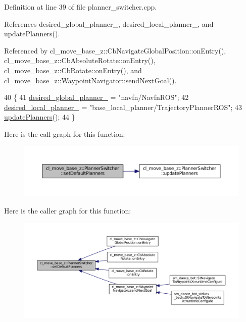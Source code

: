 Definition at line 39 of file planner\+\_\+switcher.\+cpp.



References desired\+\_\+global\+\_\+planner\+\_\+, desired\+\_\+local\+\_\+planner\+\_\+, and update\+Planners().



Referenced by cl\+\_\+move\+\_\+base\+\_\+z\+::\+Cb\+Navigate\+Global\+Position\+::on\+Entry(), cl\+\_\+move\+\_\+base\+\_\+z\+::\+Cb\+Absolute\+Rotate\+::on\+Entry(), cl\+\_\+move\+\_\+base\+\_\+z\+::\+Cb\+Rotate\+::on\+Entry(), and cl\+\_\+move\+\_\+base\+\_\+z\+::\+Waypoint\+Navigator\+::send\+Next\+Goal().


\begin{DoxyCode}
40 \{
41   \hyperlink{classcl__move__base__z_1_1PlannerSwitcher_aef047d3778b2993c1df146bbad43e03d}{desired\_global\_planner\_} = \textcolor{stringliteral}{"navfn/NavfnROS"};
42   \hyperlink{classcl__move__base__z_1_1PlannerSwitcher_a6cbf65f11bb69125f913caaabdf7b4cf}{desired\_local\_planner\_} = \textcolor{stringliteral}{"base\_local\_planner/TrajectoryPlannerROS"};
43   \hyperlink{classcl__move__base__z_1_1PlannerSwitcher_a146641f63aea3185daab4c5cbb789550}{updatePlanners}();
44 \}
\end{DoxyCode}


Here is the call graph for this function\+:
\nopagebreak
\begin{figure}[H]
\begin{center}
\leavevmode
\includegraphics[width=350pt]{classcl__move__base__z_1_1PlannerSwitcher_ad3f0d08a51af6218d203bf44a7f9df40_cgraph}
\end{center}
\end{figure}




Here is the caller graph for this function\+:
\nopagebreak
\begin{figure}[H]
\begin{center}
\leavevmode
\includegraphics[width=350pt]{classcl__move__base__z_1_1PlannerSwitcher_ad3f0d08a51af6218d203bf44a7f9df40_icgraph}
\end{center}
\end{figure}


